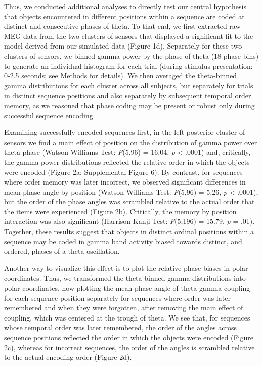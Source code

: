 Thus, we conducted additional analyses to directly test our central
hypothesis that objects encountered in different positions within a
sequence are coded at distinct and consecutive phases of theta. To that
end, we first extracted raw MEG data from the two clusters of sensors
that displayed a significant fit to the model derived from our simulated
data (Figure 1d). Separately for these two clusters of sensors, we
binned gamma power by the phase of theta (18 phase bins) to generate an
individual histogram for each trial (during stimulus presentation: 0-2.5
seconds; see Methods for details). We then averaged the theta-binned
gamma distributions for each cluster across all subjects, but separately
for trials in distinct sequence positions and also separately by
subsequent temporal order memory, as we reasoned that phase coding may
be present or robust only during successful sequence encoding.

Examining successfully encoded sequences first, in the left posterior
cluster of sensors we find a main effect of position on the distribution
of gamma power over theta phase (Watson-Williams Test: \emph{F}(5,96) =
16.04, \emph{p} \textless{} .0001) and, critically, the gamma power
distributions reflected the relative order in which the objects were
encoded (Figure 2a; Supplemental Figure 6). By contrast, for sequences
where order memory was later incorrect, we observed significant
differences in mean phase angle by position (Watson-Williams Test:
\emph{F}(5,96) = 5.26, \emph{p} \textless{} .0001), but the order of the
phase angles was scrambled relative to the actual order that the items
were experienced (Figure 2b). Critically, the memory by position
interaction was also significant (Harrison-Kanji Test: \emph{F}(5,196) =
15.79, \emph{p} = .01). Together, these results suggest that objects in
distinct ordinal positions within a sequence may be coded in gamma band
activity biased towards distinct, and ordered, phases of a theta
oscillation.

Another way to visualize this effect is to plot the relative phase
biases in polar coordinates. Thus, we transformed the theta-binned gamma
distributions into polar coordinates, now plotting the mean phase angle
of theta-gamma coupling for each sequence position separately for
sequences where order was later remembered and when they were forgotten,
after removing the main effect of coupling, which was centered at the
trough of theta. We see that, for sequences whose temporal order was
later remembered, the order of the angles across sequence positions
reflected the order in which the objects were encoded (Figure 2c),
whereas for incorrect sequences, the order of the angles is scrambled
relative to the actual encoding order (Figure 2d).

